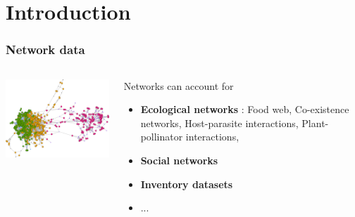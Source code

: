 \documentclass[compress,10pt]{beamer}
\newcommand{\myemph}[1]{\textbf{\textcolor{dgreen}{#1}}}
\begin{document}
\section{Introduction}
\begin{frame}\frametitle{Network data}
\begin{columns}
 \begin{column}{0.4 \textwidth}
  \begin{center}
 \includegraphics[width=\textwidth]{plots/image_SBM.png}
\end{center}

 \end{column}
\begin{column}{0.6 \textwidth}
 Networks can account for 
\begin{itemize}
\item  \myemph{Ecological networks} : Food web, Co-existence networks, Host-parasite interactions, Plant-pollinator interactions,
\item \myemph{Social networks} 
\item  \myemph{Inventory datasets}  
\item ... 
\end{itemize}
 \end{column}

\end{columns}

\end{frame}
\end{document}
